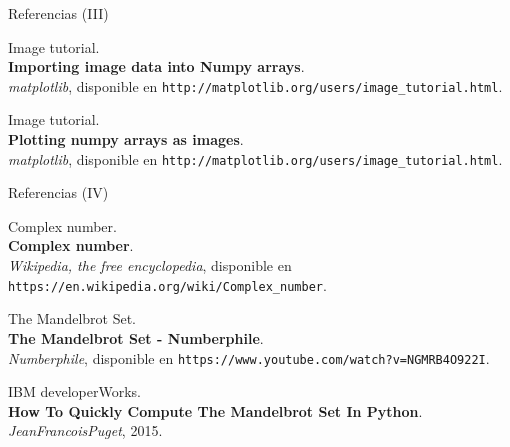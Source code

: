 \documentclass[usenames,dvipsnames]{beamer}
\begin{document}
  \begin{frame}{Referencias (III)}
    \begin{enumerate}[{[}1{]}]
      \addtocounter{enumi}{6}

      \item Image tutorial.\\
      \textbf{Importing image data into Numpy arrays}.\\
      \textit{matplotlib},
      disponible en \texttt{http://matplotlib.org/users/image\_tutorial.html}.

      \item Image tutorial.\\
      \textbf{Plotting numpy arrays as images}.\\
      \textit{matplotlib},
      disponible en \texttt{http://matplotlib.org/users/image\_tutorial.html}.
    \end{enumerate}
  \end{frame}

  \begin{frame}{Referencias (IV)}
    \begin{enumerate}[{[}1{]}]
      \addtocounter{enumi}{8}

      \item Complex number.\\
      \textbf{Complex number}.\\
      \textit{Wikipedia, the free encyclopedia},
      disponible en \texttt{https://en.wikipedia.org/wiki/Complex\_number}.

      \item The Mandelbrot Set.\\
      \textbf{The Mandelbrot Set - Numberphile}.\\
      \textit{Numberphile},
      disponible en \texttt{https://www.youtube.com/watch?v=NGMRB4O922I}.

      \item IBM developerWorks.\\
      \textbf{How To Quickly Compute The Mandelbrot Set In Python}.\\
      \textit{JeanFrancoisPuget}, 2015.
    \end{enumerate}
  \end{frame}
\end{document}
